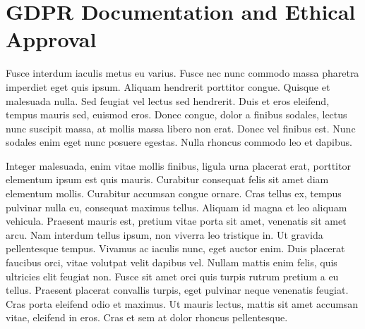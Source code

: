 \section{GDPR Documentation and Ethical Approval}
\label{app:A}

\MAEindent

Fusce interdum iaculis metus eu varius. Fusce nec nunc commodo massa pharetra imperdiet eget quis ipsum. Aliquam hendrerit porttitor congue. Quisque et malesuada nulla. Sed feugiat vel lectus sed hendrerit. Duis et eros eleifend, tempus mauris sed, euismod eros. Donec congue, dolor a finibus sodales, lectus nunc suscipit massa, at mollis massa libero non erat. Donec vel finibus est. Nunc sodales enim eget nunc posuere egestas. Nulla rhoncus commodo leo et dapibus.

Integer malesuada, enim vitae mollis finibus, ligula urna placerat erat, porttitor elementum ipsum est quis mauris. Curabitur consequat felis sit amet diam elementum mollis. Curabitur accumsan congue ornare. Cras tellus ex, tempus pulvinar nulla eu, consequat maximus tellus. Aliquam id magna et leo aliquam vehicula. Praesent mauris est, pretium vitae porta sit amet, venenatis sit amet arcu. Nam interdum tellus ipsum, non viverra leo tristique in. Ut gravida pellentesque tempus. Vivamus ac iaculis nunc, eget auctor enim. Duis placerat faucibus orci, vitae volutpat velit dapibus vel. Nullam mattis enim felis, quis ultricies elit feugiat non. Fusce sit amet orci quis turpis rutrum pretium a eu tellus. Praesent placerat convallis turpis, eget pulvinar neque venenatis feugiat. Cras porta eleifend odio et maximus. Ut mauris lectus, mattis sit amet accumsan vitae, eleifend in eros. Cras et sem at dolor rhoncus pellentesque. 




